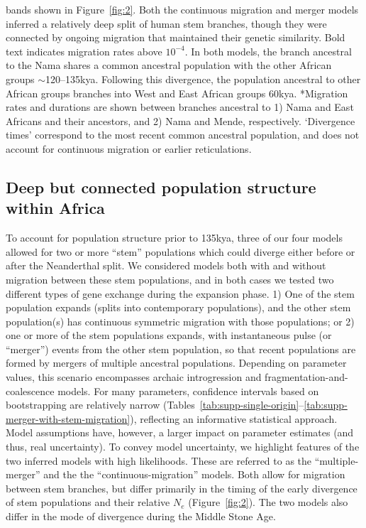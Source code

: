 \documentclass[]{article}
\begin{document}
\begin{table}[t!]
{        bands shown in Figure~\ref{fig:2}. Both the continuous migration and
        merger models inferred a relatively deep split of human stem branches,
        though they were connected by ongoing migration that maintained their
        genetic similarity. Bold text indicates migration rates above $10^{-4}$. 
        In both models, the branch ancestral to the Nama shares a common ancestral population 
        with the other African groups $\sim$120--135kya. Following this divergence, 
        the population ancestral to other African groups branches into West and East African
        groups 60kya. *Migration rates and durations are shown between branches ancestral to 1) Nama and East Africans
        and their ancestors, and 2) Nama and Mende, respectively.
        `Divergence times' correspond to the most recent common ancestral population, and does not account for continuous migration or earlier reticulations.
    }
    \label{tab:migration-rates}
\end{table}

\subsection*{Deep but connected population structure within Africa}

To account for population structure prior to 135kya, three of our four models allowed for two or more
``stem'' populations which could diverge either before or after the Neanderthal
split. We considered models both with and without migration between these stem
populations, and in both cases we tested two different types of gene exchange
during the expansion phase. 1) One of the stem population expands (splits into
contemporary populations), and the other stem population(s) has continuous
symmetric migration with those populations; or 2) one or more of the stem
populations expands, with instantaneous pulse (or ``merger'') events from the
other stem population, so that recent populations are formed by mergers of multiple ancestral populations. Depending on parameter values,
this scenario encompasses archaic introgression and
fragmentation-and-coalescence models. For many parameters, confidence intervals based on bootstrapping are relatively narrow
(Tables~\ref{tab:supp-single-origin}--\ref{tab:supp-merger-with-stem-migration}),
reflecting an informative statistical approach. Model assumptions
have, however, a larger impact on parameter estimates (and thus, real uncertainty). To convey model uncertainty, we
highlight features of the two inferred models with high likelihoods. These are referred to as the
``multiple-merger'' and the the ``continuous-migration'' models. Both allow for
migration between stem branches, but differ primarily in the timing of the
early divergence of stem populations and their relative $N_e$
(Figure~\ref{fig:2}). The two models also differ in the mode of divergence
during the Middle Stone Age.
\end{document}
